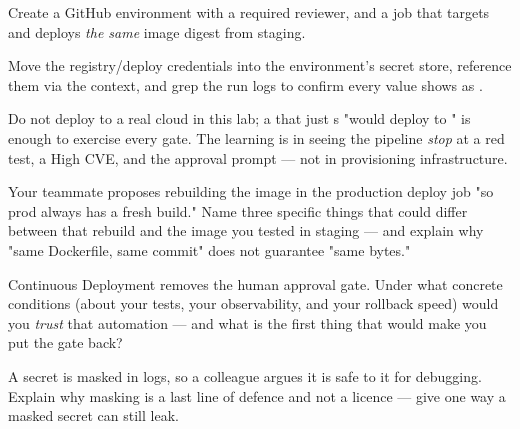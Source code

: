 Create a GitHub  environment with a required reviewer, and a  job that targets  and deploys \emph{the same} image digest from staging.

Move the registry/deploy credentials into the environment's secret store, reference them via the  context, and grep the run logs to confirm every value shows as \code{***}.

\begin{prodtip}
Do not deploy to a real cloud in this lab; a  that just s "would deploy  to " is enough to exercise every gate. The learning is in seeing the pipeline \emph{stop} at a red test, a High CVE, and the approval prompt --- not in provisioning infrastructure.
\end{prodtip}


\begin{thinkbox}
Your teammate proposes rebuilding the image in the production deploy job "so prod always has a fresh build." Name three specific things that could differ between that rebuild and the image you tested in staging --- and explain why "same Dockerfile, same commit" does not guarantee "same bytes."
\end{thinkbox}

\begin{thinkbox}
Continuous Deployment removes the human approval gate. Under what concrete conditions (about your tests, your observability, and your rollback speed) would you \emph{trust} that automation --- and what is the first thing that would make you put the gate back?
\end{thinkbox}

\begin{thinkbox}
A secret is masked in logs, so a colleague argues it is safe to  it for debugging. Explain why masking is a last line of defence and not a licence --- give one way a masked secret can still leak.
\end{thinkbox}

